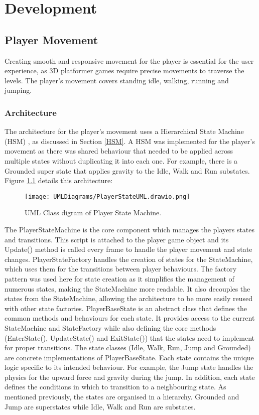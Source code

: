 \documentclass[10pt]{final_report}
\begin{document}
\chapter{Development}
\section{Player Movement}
Creating smooth and responsive movement for the player is essential for the user experience, as 3D platformer games require precise movements to traverse the levels. The player's movement covers standing idle, walking, running and jumping. 
\subsection{Architecture}
The architecture for the player's movement uses a Hierarchical State Machine (HSM) , as discussed in Section \ref{HSM}.  A HSM was implemented for the player's movement as there was shared behaviour that needed to be applied across multiple states without duplicating it into each one. For example, there is a Grounded super state that applies gravity to the Idle, Walk and Run substates. Figure \ref{fig:label_State} details this architecture:

\begin{figure}[h!]
    \centering
    \texttt{[image: UMLDiagrams/PlayerStateUML.drawio.png]}
    \caption{UML Class digram of Player State Machine.}
    \label{fig:label_State}
\end{figure}

The PlayerStateMachine is the core component which manages the players states and transitions. This script is attached to the player game object and its Update() method is called every frame to handle the player movement and state changes. PlayerStateFactory handles the creation of states for the StateMachine, which uses them for the transitions between player behaviours. The factory pattern was used here for state creation as it simplifies the management of numerous states, making the StateMachine more readable. It also decouples the states from the StateMachine, allowing the architecture to be more easily reused with other state factories. PlayerBaseState is an abstract class that defines the common methods and behaviours for each state.  It provides access to the current StateMachine and StateFactory while also defining the core methods (EnterState(), UpdateState() and ExitState()) that the states need to implement for proper transitions. The state classes (Idle, Walk, Run, Jump and Grounded) are concrete implementations of PlayerBaseState. Each state contains the unique logic specific to its intended behaviour. For example, the Jump state handles the physics for the upward force and gravity during the jump. In addition, each state defines the conditions in which to transition to a neighbouring state. As mentioned previously, the states are organised in a hierarchy. Grounded and Jump are superstates while Idle, Walk and Run are substates. 
\end{document}
